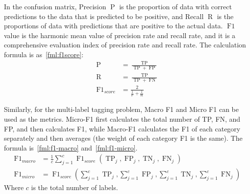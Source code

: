 In the confusion matrix, Precision \(\operatorname{P}\) is the proportion of data with correct predictions to the data that is predicted to be positive, and Recall \(\operatorname{R}\) is the proportions of data with predictions that are positive to the actual data. \(\operatorname{F1}\) value is the harmonic mean value of precision rate and recall rate, and it is a comprehensive evaluation index of precision rate and recall rate. The calculation formula is as~\ref{fml:f1score}:
\begin{equation}
	\begin{align}\label{fml:f1score}
		\operatorname{P}          & =\frac{\operatorname{TP}}{\operatorname{TP}+\operatorname{FP}}    \\
		\operatorname{R}          & =\frac{\operatorname{TP}}{\operatorname{TP}+\operatorname{FN}}    \\
		\operatorname{F1}_{score} & = \frac{2}{\frac{1}{\operatorname{P}}+\frac{1}{\operatorname{R}}}
	\end{align}
\end{equation}

Similarly, for the multi-label tagging problem, Macro F1 and Micro F1 can be used as the metrics. Micro-F1 first calculates the total number of TP, FN, and FP, and then calculates F1, while Macro-F1 calculates the F1 of each category separately and then averages (the weight of each category F1 is the same). The formula is~\ref{fml:f1-macro} and~\ref{fml:f1-micro}.
\begin{align}
	\operatorname{F1}_{macro} & =\frac{1}{c} \sum_{j=1}^{c} \operatorname{F1}_{score}(\operatorname{TP}_{j}, \operatorname{FP}_{j}, \operatorname{TN}_{j}, \operatorname{FN}_{j}) \label{fml:f1-macro}                                  \\
	\operatorname{F1}_{micro} & =\operatorname{F1}_{score}(\sum_{j=1}^{c} \operatorname{TP}_{j}, \sum_{j=1}^{c} \operatorname{FP}_{j}, \sum_{j=1}^{c} \operatorname{TN}_{j}, \sum_{j=1}^{c} \operatorname{FN}_{j}) \label{fml:f1-micro}
\end{align}
Where \(c\) is the total number of labels.

